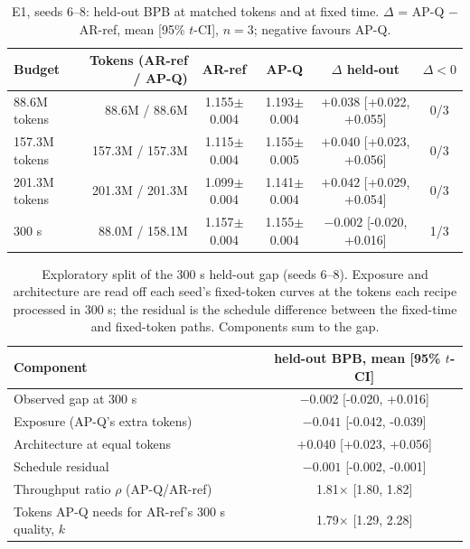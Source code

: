\begin{table}[t]\centering\small
\caption{E1, seeds 6--8: held-out BPB at matched tokens and at fixed time. $\Delta$ = AP-Q $-$ AR-ref, mean [95\% $t$-CI], $n=3$; negative favours AP-Q.}
\label{tab:e1}
\begin{tabular}{lrcccc}
\toprule
Budget & Tokens (AR-ref / AP-Q) & AR-ref & AP-Q & $\Delta$ held-out & $\Delta<0$ \\
\midrule
88.6M tokens & 88.6M / 88.6M & 1.155$\pm$0.004 & 1.193$\pm$0.004 & $+0.038$ \scriptsize[+0.022, +0.055] & 0/3 \\
157.3M tokens & 157.3M / 157.3M & 1.115$\pm$0.004 & 1.155$\pm$0.005 & $+0.040$ \scriptsize[+0.023, +0.056] & 0/3 \\
201.3M tokens & 201.3M / 201.3M & 1.099$\pm$0.004 & 1.141$\pm$0.004 & $+0.042$ \scriptsize[+0.029, +0.054] & 0/3 \\
\midrule
300 s & 88.0M / 158.1M & 1.157$\pm$0.004 & 1.155$\pm$0.004 & $-0.002$ \scriptsize[-0.020, +0.016] & 1/3 \\
\bottomrule
\end{tabular}
\end{table}

\begin{table}[t]\centering\small
\caption{Exploratory split of the 300 s held-out gap (seeds 6--8). Exposure and architecture are read off each seed's fixed-token curves at the tokens each recipe processed in 300 s; the residual is the schedule difference between the fixed-time and fixed-token paths. Components sum to the gap.}
\label{tab:e1-split}
\begin{tabular}{lc}
\toprule
Component & held-out BPB, mean [95\% $t$-CI] \\
\midrule
Observed gap at 300 s & $-0.002$ \scriptsize[-0.020, +0.016] \\
Exposure (AP-Q's extra tokens) & $-0.041$ \scriptsize[-0.042, -0.039] \\
Architecture at equal tokens & $+0.040$ \scriptsize[+0.023, +0.056] \\
Schedule residual & $-0.001$ \scriptsize[-0.002, -0.001] \\
\midrule
Throughput ratio $\rho$ (AP-Q/AR-ref) & 1.81$\times$ \scriptsize[1.80, 1.82] \\
Tokens AP-Q needs for AR-ref's 300 s quality, $k$ & 1.79$\times$ \scriptsize[1.29, 2.28] \\
\bottomrule
\end{tabular}
\end{table}
